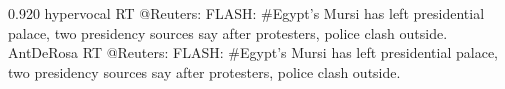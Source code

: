 %
%

{0.920}
{\joinNameTweet
{hypervocal}
{RT @Reuters: FLASH: \#Egypt's Mursi has left presidential palace, two presidency sources say after protesters, police clash outside.}}
{\joinNameTweet
{AntDeRosa}
{RT @Reuters: FLASH: \#Egypt's Mursi has left presidential palace, two presidency sources say after protesters, police clash outside.}}
%
%
%
%

